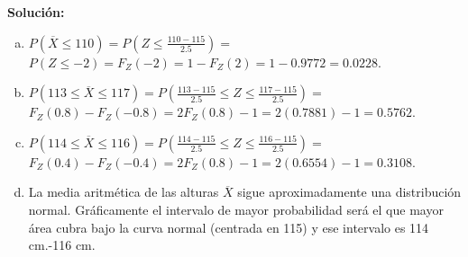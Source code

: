 \begin{frame}
     \textbf{Solución:}
\begin{enumerate}[a)]
 \item $P(\overline{X}\leq 110)= P(Z\leq \frac{110-115}{2.5})=$
 $P(Z\leq -2)=F_{Z}(-2)=1-F_{Z}(2)=1-0.9772=0.0228$.
\item $P(113\leq  \overline{X} \leq 117)= P(\frac{113-115}{2.5}\leq
  Z \leq \frac{117-115}{2.5})=$
  $F_{Z}(0.8)-F_{Z}(-0.8)=
  2 F_{Z}(0.8) -1= 2 (0.7881)-1=0.5762$.
\item $P(114\leq  \overline{X} \leq 116)= P(\frac{114-115}{2.5}\leq
  Z \leq \frac{116-115}{2.5})=$
  $F_{Z}(0.4)-F_{Z}(-0.4)=2 F_{Z}(0.8) -1= 2 (0.6554)-1=0.3108$.
\item La media aritmética de las alturas $\overline{X}$ sigue
  aproximadamente una distribución normal. Gráficamente el
  intervalo de mayor probabilidad será el que mayor área cubra bajo
  la curva normal (centrada en 115) y ese intervalo es
  114 cm.-116 cm.
\end{enumerate}
\end{frame}

